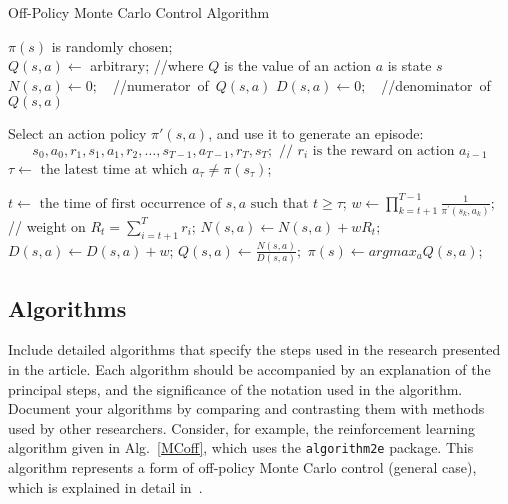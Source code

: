 \documentclass{llncs}
\begin{document}
\begin{algorithm}[!t]
 \caption{Off-Policy Monte Carlo Control Algorithm\label{MCoff}}
 \DontPrintSemicolon



 \SetAlgoLined
  {$\pi(s)$ is randomly chosen;\\
  $Q\left(s,a\right)  \longleftarrow $ arbitrary; //where $Q$ is the value of an action $a$ is state $s$\;
   $N(s,a)  \longleftarrow  0 ; \quad $//numerator~of~$Q(s,a)$ \;
   $D(s,a)  \longleftarrow  0 ; \quad $//denominator~of~$Q(s,a)$ \;
  }%
{Select an action policy $ \pi'(s,a)$, and use it to generate an episode: $$s_0,a_0,r_1,s_1,a_1,r_2,\ldots,s_{T-1},a_{T-1},r_T,s_T; \mbox{ // } r_i \mbox{ is the reward on action } a_{i-1}$$\;
$\tau \longleftarrow \mbox{ the latest time at which } a_{\tau} \neq \pi(s_{\tau})$;\;

  {
 $t \longleftarrow \mbox{ the time of first occurrence of } s,a \mbox{ such that } t\geq \tau$; \;
 $w  \longleftarrow \prod_{k=t+1}^{T-1} \frac{{1}}{\pi^{\prime}(s_k,a_k)};$  // weight on $R_t=\sum_{i=t+1}^{T}r_{i}$;
  $N(s,a)  \longleftarrow N(s,a) + wR_t  $; \;
  $D(s,a)  \longleftarrow D(s,a) + w $; \;
  $Q(s,a)  \longleftarrow \frac{{N(s,a)}}{{D(s,a)}} ; $\;
  }%
  {$ \pi (s) \longleftarrow   argmax_a   Q(s,a)$; \;
  }%
 } %

\end{algorithm}

\subsection{Algorithms} Include detailed algorithms that specify the steps used in the research presented in the article.  Each algorithm should be accompanied by an explanation of the principal steps, and the significance of the notation used in the algorithm.  Document your algorithms by comparing and contrasting them with methods used by other researchers.  Consider, for example, the reinforcement learning algorithm given in Alg.~\ref{MCoff}, which uses the \verb|algorithm2e| package.  This algorithm represents a form of off-policy Monte Carlo control (general case), which is explained in detail in~\cite{PH06,SB1}.
\end{document}
